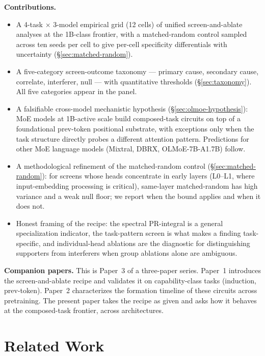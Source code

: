 \documentclass[11pt]{article}
\begin{document}
\textbf{Contributions.}
\begin{itemize}[topsep=2pt,itemsep=2pt]
\item A 4-task $\times$ 3-model empirical grid (12 cells) of unified screen-and-ablate analyses at the 1B-class frontier, with a matched-random control sampled across ten seeds per cell to give per-cell specificity differentials with uncertainty (\S\ref{sec:matched-random}).
\item A five-category screen-outcome taxonomy --- primary cause, secondary cause, correlate, interferer, null --- with quantitative thresholds (\S\ref{sec:taxonomy}). All five categories appear in the panel.
\item A falsifiable cross-model mechanistic hypothesis (\S\ref{sec:olmoe-hypothesis}): MoE models at 1B-active scale build composed-task circuits on top of a foundational prev-token positional substrate, with exceptions only when the task structure directly probes a different attention pattern. Predictions for other MoE language models (Mixtral, DBRX, OLMoE-7B-A1.7B) follow.
\item A methodological refinement of the matched-random control (\S\ref{sec:matched-random}): for screens whose heads concentrate in early layers (L0--L1, where input-embedding processing is critical), same-layer matched-random has high variance and a weak null floor; we report when the bound applies and when it does not.
\item Honest framing of the recipe: the spectral PR-integral is a general specialization indicator, the task-pattern screen is what makes a finding task-specific, and individual-head ablations are the diagnostic for distinguishing supporters from interferers when group ablations alone are ambiguous.
\end{itemize}

\textbf{Companion papers.} This is Paper~3 of a three-paper series. Paper~1 \citep{paper1_methodology} introduces the screen-and-ablate recipe and validates it on capability-class tasks (induction, prev-token). Paper~2 \citep{paper2_developmental} characterizes the formation timeline of these circuits across pretraining. The present paper takes the recipe as given and asks how it behaves at the composed-task frontier, across architectures.

\section{Related Work}
\label{sec:related}
\end{document}
